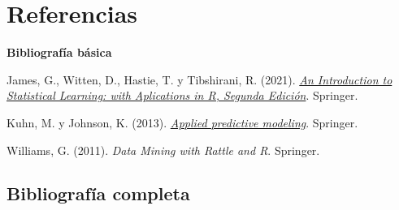 \documentclass[
  spanish,
]{book}
\theoremstyle{break}
\theoremstyle{definition}
\theoremstyle{definition}
\theoremstyle{definition}
\theoremstyle{definition}
\theoremstyle{remark}
\begin{document}
\hypertarget{referencias}{%
\chapter*{Referencias}\label{referencias}}

\textbf{Bibliografía básica}

James, G., Witten, D., Hastie, T. y Tibshirani, R. (2021). \emph{\href{https://www.statlearning.com}{An Introduction to Statistical Learning: with Aplications in R, Segunda Edición}}. Springer.

Kuhn, M. y Johnson, K. (2013). \emph{\href{http://appliedpredictivemodeling.com}{Applied predictive modeling}}. Springer.

Williams, G. (2011). \emph{Data Mining with Rattle and R}. Springer.

\hypertarget{bibliografuxeda-completa}{%
\section*{Bibliografía completa}\label{bibliografuxeda-completa}}
\end{document}
